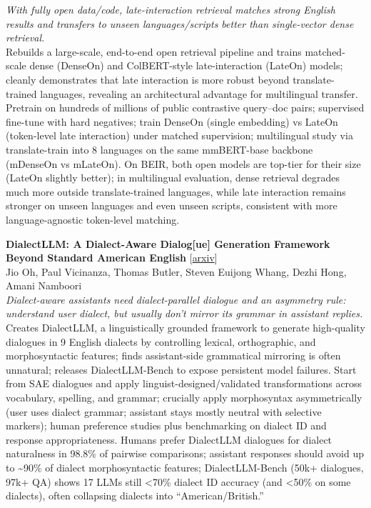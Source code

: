 \documentclass[12pt,letterpaper]{article}
\begin{document}
{\small\textit{With fully open data/code, late-interaction retrieval matches strong English results and transfers to unseen languages/scripts better than single-vector dense retrieval.}}\\[1pt]
{\footnotesize Rebuilds a large-scale, end-to-end open retrieval pipeline and trains matched-scale dense (DenseOn) and ColBERT-style late-interaction (LateOn) models; cleanly demonstrates that late interaction is more robust beyond translate-trained languages, revealing an architectural advantage for multilingual transfer. Pretrain on hundreds of millions of public contrastive query--doc pairs; supervised fine-tune with hard negatives; train DenseOn (single embedding) vs LateOn (token-level late interaction) under matched supervision; multilingual study via translate-train into 8 languages on the same mmBERT-base backbone (mDenseOn vs mLateOn). On BEIR, both open models are top-tier for their size (LateOn slightly better); in multilingual evaluation, dense retrieval degrades much more outside translate-trained languages, while late interaction remains stronger on unseen languages and even unseen scripts, consistent with more language-agnostic token-level matching.}

\medskip

{\small\textbf{DialectLLM: A Dialect-Aware Dialog[ue] Generation Framework Beyond Standard American English}} {\scriptsize[\href{https://arxiv.org/abs/2601.22888}{arxiv}]}\\
{\scriptsize Jio Oh, Paul Vicinanza, Thomas Butler, Steven Euijong Whang, Dezhi Hong, Amani Namboori}\\

{\small\textit{Dialect-aware assistants need dialect-parallel dialogue and an asymmetry rule: understand user dialect, but usually don't mirror its grammar in assistant replies.}}\\[1pt]
{\footnotesize Creates DialectLLM, a linguistically grounded framework to generate high-quality dialogues in 9 English dialects by controlling lexical, orthographic, and morphosyntactic features; finds assistant-side grammatical mirroring is often unnatural; releases DialectLLM-Bench to expose persistent model failures. Start from SAE dialogues and apply linguist-designed/validated transformations across vocabulary, spelling, and grammar; crucially apply morphosyntax asymmetrically (user uses dialect grammar; assistant stays mostly neutral with selective markers); human preference studies plus benchmarking on dialect ID and response appropriateness. Humans prefer DialectLLM dialogues for dialect naturalness in 98.8\% of pairwise comparisons; assistant responses should avoid up to \textasciitilde{}90\% of dialect morphosyntactic features; DialectLLM-Bench (50k+ dialogues, 97k+ QA) shows 17 LLMs still <70\% dialect ID accuracy (and <50\% on some dialects), often collapsing dialects into ``American/British.''}
\end{document}
